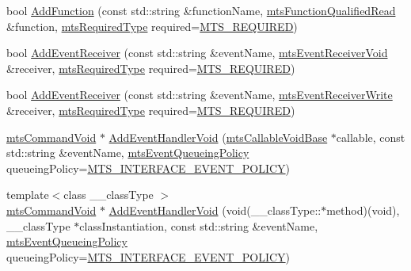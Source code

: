 \begin{DoxyCompactItemize}
\item 
bool \hyperlink{classmts_interface_required_ac547873315387815119d06ba2301c7c4}{Add\-Function} (const std\-::string \&function\-Name, \hyperlink{classmts_function_qualified_read}{mts\-Function\-Qualified\-Read} \&function, \hyperlink{mts_forward_declarations_8h_a9ef1ce54724afde7802db326ff8606f3}{mts\-Required\-Type} required=\hyperlink{mts_forward_declarations_8h_a9ef1ce54724afde7802db326ff8606f3ae01fd85391b60e546bbb1be9716c4ec9}{M\-T\-S\-\_\-\-R\-E\-Q\-U\-I\-R\-E\-D})
\item 
bool \hyperlink{classmts_interface_required_aa9146d63a8b06974615f36e01151e143}{Add\-Event\-Receiver} (const std\-::string \&event\-Name, \hyperlink{classmts_event_receiver_void}{mts\-Event\-Receiver\-Void} \&receiver, \hyperlink{mts_forward_declarations_8h_a9ef1ce54724afde7802db326ff8606f3}{mts\-Required\-Type} required=\hyperlink{mts_forward_declarations_8h_a9ef1ce54724afde7802db326ff8606f3ae01fd85391b60e546bbb1be9716c4ec9}{M\-T\-S\-\_\-\-R\-E\-Q\-U\-I\-R\-E\-D})
\item 
bool \hyperlink{classmts_interface_required_aff8e30bfcb14685dfa7082f7f6459cc6}{Add\-Event\-Receiver} (const std\-::string \&event\-Name, \hyperlink{classmts_event_receiver_write}{mts\-Event\-Receiver\-Write} \&receiver, \hyperlink{mts_forward_declarations_8h_a9ef1ce54724afde7802db326ff8606f3}{mts\-Required\-Type} required=\hyperlink{mts_forward_declarations_8h_a9ef1ce54724afde7802db326ff8606f3ae01fd85391b60e546bbb1be9716c4ec9}{M\-T\-S\-\_\-\-R\-E\-Q\-U\-I\-R\-E\-D})
\item 
\hyperlink{classmts_command_void}{mts\-Command\-Void} $\ast$ \hyperlink{classmts_interface_required_a195ee62f3fa85dbfd1ce92cb1f745603}{Add\-Event\-Handler\-Void} (\hyperlink{classmts_callable_void_base}{mts\-Callable\-Void\-Base} $\ast$callable, const std\-::string \&event\-Name, \hyperlink{mts_forward_declarations_8h_a9286ac2ca46e5bcd57059550faa96916}{mts\-Event\-Queueing\-Policy} queueing\-Policy=\hyperlink{mts_forward_declarations_8h_a9286ac2ca46e5bcd57059550faa96916a3d4338e85690d50e9ab167be77cdefa0}{M\-T\-S\-\_\-\-I\-N\-T\-E\-R\-F\-A\-C\-E\-\_\-\-E\-V\-E\-N\-T\-\_\-\-P\-O\-L\-I\-C\-Y})
\item 
{\footnotesize template$<$class \-\_\-\-\_\-class\-Type $>$ }\\\hyperlink{classmts_command_void}{mts\-Command\-Void} $\ast$ \hyperlink{classmts_interface_required_a49e6b415fd639fc8ddfea29bc99e698d}{Add\-Event\-Handler\-Void} (void(\-\_\-\-\_\-class\-Type\-::$\ast$method)(void), \-\_\-\-\_\-class\-Type $\ast$class\-Instantiation, const std\-::string \&event\-Name, \hyperlink{mts_forward_declarations_8h_a9286ac2ca46e5bcd57059550faa96916}{mts\-Event\-Queueing\-Policy} queueing\-Policy=\hyperlink{mts_forward_declarations_8h_a9286ac2ca46e5bcd57059550faa96916a3d4338e85690d50e9ab167be77cdefa0}{M\-T\-S\-\_\-\-I\-N\-T\-E\-R\-F\-A\-C\-E\-\_\-\-E\-V\-E\-N\-T\-\_\-\-P\-O\-L\-I\-C\-Y})

\end{DoxyCompactItemize}
